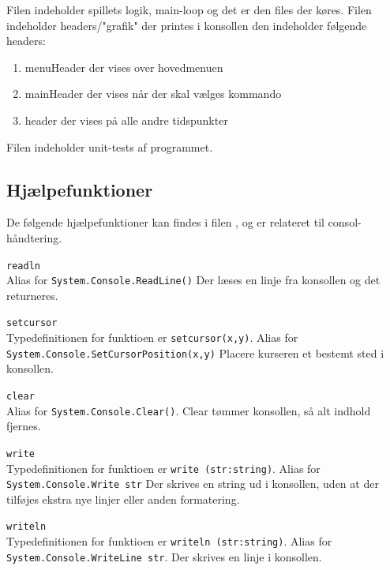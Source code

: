 \documentclass[a4paper]{article}
\begin{document}
    Filen  indeholder spillets logik, main-loop og det er den files der køres.
    Filen  indeholder headers/"grafik" der printes i konsollen den indeholder følgende headers:
    \begin{enumerate}
      \item menuHeader der vises over hovedmenuen
      \item mainHeader der vises når der skal vælges kommando
      \item header der vises på alle andre tidspunkter
    \end{enumerate}
    Filen  indeholder unit-tests af programmet.

    \subsection{Hjælpefunktioner} \label{ssec:helpers}
      De følgende hjælpefunktioner kan findes i filen , og er relateret til consol-håndtering.
      \begin{description}
      
        \item{\texttt{readln}}~\\
          Alias for \lstinline$System.Console.ReadLine()$
          Der læses en linje fra konsollen og det returneres.

        \item{\texttt{setcursor}}~\\
          Typedefinitionen for funktioen er \lstinline$setcursor(x,y)$.
          Alias for \lstinline$System.Console.SetCursorPosition(x,y)$
          Placere kurseren et bestemt sted i konsollen.

        \item{\texttt{clear}}~\\
          Alias for \lstinline$System.Console.Clear()$.
          Clear tømmer konsollen, så alt indhold fjernes.

        \item{\texttt{write}}~\\
          Typedefinitionen for funktioen er \lstinline$write (str:string)$.
          Alias for \lstinline$System.Console.Write str$
          Der skrives en string ud i konsollen, uden at der tilføjes ekstra nye linjer eller anden formatering.

        \item{\texttt{writeln}}~\\
          Typedefinitionen for funktioen er \lstinline$writeln (str:string)$.
          Alias for \lstinline$System.Console.WriteLine str$.
          Der skrives en linje i konsollen.
      \end{description}~\\
      
\end{document}
